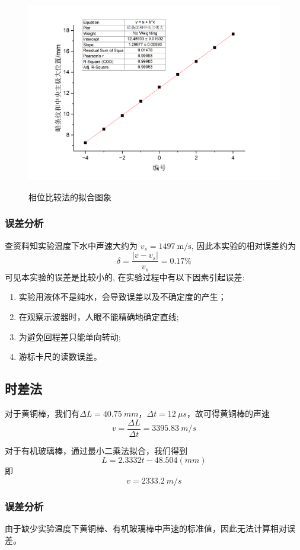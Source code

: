 \documentclass{article}
\begin{document}
\begin{figure}[h]
    \centering
    \caption{相位比较法的拟合图象}
    \includegraphics[scale=0.5]{graph2.png}
    \label{graph2}
\end{figure}
\subsubsection*{误差分析}
查资料知实验温度下水中声速大约为 $v_s=1497 \mathrm{~m} / \mathrm{s}$, 因此本实验的相对误差约为
$$
    \delta=\frac{\left|v-v_s\right|}{v_s}=0.17 \%
$$
可见本实验的误差是比较小的, 在实验过程中有以下因素引起误差:
\begin{enumerate}
\item 实验用液体不是纯水，会导致误差以及不确定度的产生；
\item 在观察示波器时，人眼不能精确地确定直线;
\item 为避免回程差只能单向转动;
\item 游标卡尺的读数误差。
\end{enumerate}


\subsection*{时差法}
对于黄铜棒，我们有$\Delta L=\SI{40.75}{mm}$，$\Delta t=\SI{12}{\mu s}$，故可得黄铜棒的声速
\[v=\frac{\Delta L}{\Delta t}=\SI{3395.83}{m/s}\]

对于有机玻璃棒，通过最小二乘法拟合，我们得到
\[L=2.3332t-48.504(\si{}{mm})\]
即\[v=\SI{2333.2}{m/s}\]

\subsubsection*{误差分析}
由于缺少实验温度下黄铜棒、有机玻璃棒中声速的标准值，因此无法计算相对误差。
\end{document}
